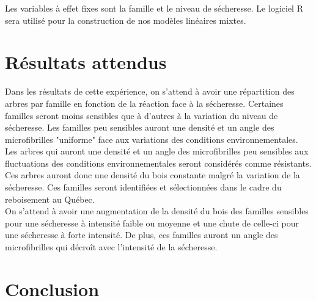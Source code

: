 \documentclass{report}
\begin{document}

Les variables à effet fixes sont la famille et le niveau de sécheresse. Le logiciel R sera utilisé pour la construction de nos modèles linéaires mixtes. 

\section*{Résultats attendus}

Dans les résultats de cette expérience, on s'attend à avoir une répartition des arbres par famille en fonction de la réaction face à la sécheresse. 
Certaines familles seront moins sensibles que à d'autres à la variation du niveau de sécheresse. Les familles peu sensibles auront une densité et un angle des microfibrilles "uniforme" face aux variations des conditions environnementales.\\ %

Les arbres qui auront une densité et un angle des microfibrilles peu sensibles aux fluctuations des conditions environnementales seront considérés comme résistants. Ces arbres auront donc une densité du bois constante malgré la variation de la sécheresse. Ces familles seront identifiées et sélectionnées dans le cadre du reboisement au Québec. \\

On s'attend à avoir une augmentation de la densité du bois des familles sensibles pour une sécheresse à intensité faible ou moyenne et une chute de celle-ci pour une sécheresse à forte intensité. De plus, ces familles auront un angle des microfibrilles qui décroît avec l'intensité de la sécheresse. 


\section*{Conclusion}
\end{document}
